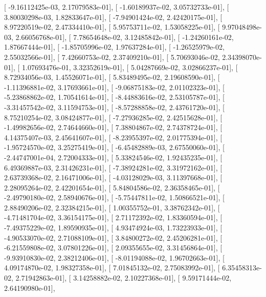 \documentclass{article}
\begin{document}
       [ -9.16112425e-03,   2.17079583e-01],
       [ -1.60189937e-02,   3.05732733e-01],
       [  3.80030298e-03,   1.82833647e-01],
       [ -7.94901424e-02,   2.42420175e-01],
       [  8.97220519e-02,   2.47334410e-01],
       [  5.95753711e-02,   1.53058225e-01],
       [  9.97048498e-03,   2.66056768e-01],
       [  7.78654648e-02,   3.12485842e-01],
       [ -1.24260161e-02,   1.87667444e-01],
       [ -1.85705996e-02,   1.97637284e-01],
       [ -1.26525979e-02,   2.55032566e-01],
       [  7.42660753e-02,   2.37409210e-01],
       [  5.70693046e-02,   2.34398070e-01],
       [  1.07693476e-01,   3.32352619e-01],
       [  5.04287669e-02,   3.02866237e-01],
       [  8.72934056e-03,   1.45526071e-01],
       [  5.83489495e-02,   2.19608590e-01],
       [ -1.11396881e-02,   3.17693661e-01],
       [ -9.06875183e-02,   2.01102323e-01],
       [ -5.23868862e-02,   1.70541614e-01],
       [ -8.44883616e-02,   2.53105787e-01],
       [ -3.31457542e-02,   3.11594753e-01],
       [ -8.57288858e-02,   2.43761720e-01],
       [  8.75210254e-02,   3.08424877e-01],
       [ -7.27936285e-02,   2.42515628e-01],
       [ -1.49982656e-02,   2.74644660e-01],
       [  7.38804867e-02,   2.74378724e-01],
       [  4.14375407e-03,   2.45641607e-01],
       [ -8.23955397e-02,   2.01775394e-01],
       [ -1.95724570e-02,   3.25275419e-01],
       [ -6.45482889e-03,   2.67550060e-01],
       [ -2.44747001e-04,   2.72004333e-01],
       [  5.33824546e-02,   1.92435235e-01],
       [  6.49369887e-03,   2.31426231e-01],
       [ -7.38924281e-02,   3.31972162e-01],
       [  2.63739368e-02,   2.16471006e-01],
       [ -4.03128029e-03,   3.11397668e-01],
       [  2.28095264e-02,   2.42201654e-01],
       [  5.84804586e-02,   2.36358465e-01],
       [ -2.49790180e-02,   2.58940676e-01],
       [ -5.75447811e-02,   1.50866521e-01],
       [  2.88490206e-02,   2.32384215e-01],
       [  1.00355752e-01,   3.38762342e-01],
       [ -4.71481704e-02,   3.36154175e-01],
       [  2.71172392e-02,   1.83360594e-01],
       [ -7.49375229e-02,   1.89590935e-01],
       [  4.93474924e-03,   1.73223933e-01],
       [ -4.90533070e-02,   2.71088109e-01],
       [  3.84800272e-02,   2.45206281e-01],
       [ -6.21559808e-02,   3.07801226e-01],
       [  2.09355655e-02,   3.31456864e-01],
       [ -9.93910830e-02,   2.38212406e-01],
       [ -8.01194088e-02,   1.96702663e-01],
       [  4.09174870e-02,   1.98327358e-01],
       [  7.01845132e-02,   2.75083992e-01],
       [  6.35458313e-02,   2.71942863e-01],
       [  3.14258882e-02,   2.10227368e-01],
       [  9.59171444e-02,   2.64190980e-01],
\end{document}

